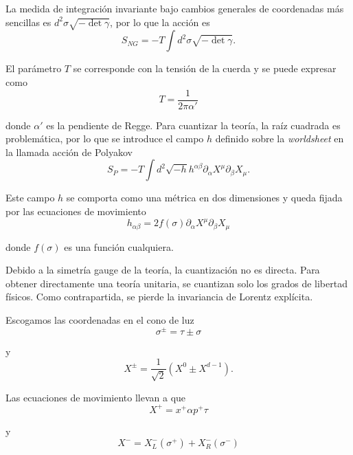 La medida de integración invariante bajo cambios generales de coordenadas más sencillas 
es $d^2\sigma \sqrt{-\det\gamma}$, por lo que la acción es
\begin{equation}
  S_{NG}=-T\int d^2\sigma \sqrt{-\det\gamma}.
\end{equation}

El parámetro $T$ se corresponde con la tensión de la cuerda y se puede expresar como
\begin{equation}
  T=\frac{1}{2\pi\alpha'}
\end{equation}

donde $\alpha'$ es la pendiente de Regge.
Para cuantizar la teoría, la raíz cuadrada es problemática, por lo que se introduce
el campo $h$ definido sobre la \emph{worldsheet} en la llamada acción de Polyakov
\begin{equation}
  S_P=-T\int d^2  \sqrt{-h}h^{\alpha\beta}\partial_\alpha X^\mu \partial_\beta X_\mu.
\end{equation}

Este campo $h$ se comporta como una métrica en dos dimensiones y queda fijada por las
ecuaciones de movimiento
\begin{equation}
  h_{\alpha\beta}=2f(\sigma)\partial_\alpha X^\mu \partial_\beta X_\mu
\end{equation}

donde $f(\sigma)$ es una función cualquiera.


Debido a la simetría gauge de la teoría, la cuantización no es directa.
Para obtener directamente una teoría unitaria, se cuantizan solo los grados de libertad 
físicos. Como contrapartida, se pierde la invariancia de Lorentz explícita.

Escogamos las coordenadas en el cono de luz
\begin{equation}
  \sigma^\pm=\tau\pm\sigma
\end{equation}

y
\begin{equation}
  X^\pm=\frac{1}{\sqrt 2} (X^0 \pm X^{d-1}).
\end{equation}

Las ecuaciones de movimiento llevan a que 
\begin{equation}
  X^+=x^+\alpha p^+ \tau
\end{equation}

y
\begin{equation}
  X^-=X^-_L(\sigma^+)+X^-_R(\sigma^-)
\end{equation}

